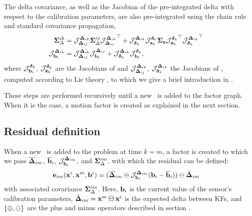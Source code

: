 The delta covariance, as well as the Jacobian of the pre-integrated delta with respect to the calibration parameters, are also pre-integrated using the chain rule and standard 
covariance propagation,
%
\begin{align}
    {\bm \Sigma}_\Delta^{ik} &= {\mathcal{J}^{{{\bm \Delta}}_{ik}}_{{{\bm \Delta}}_{ij}}}{\bm \Sigma}_\Delta^{ij}{\mathcal{J}^{{{\bm \Delta}}_{ik}}_{{{\bm \Delta}}_{ij}}}^{\top} 
    + {\mathcal{J}^{{{\bm \Delta}}_{ik}}_{\bm\delta_k}}{\mathcal{J}^{\bm\delta_k}_{{\bf z}_k}}{\bm \Sigma}_{\bf z}{\mathcal{J}^{\bm\delta_k}_{{\bf z}_k}}^{\top}{\mathcal{J}^{{{\bm \Delta}}_{ik}}_{\bm\delta_k}}^{\top}
    \\
    {\mathcal{J}^{{{\bm \Delta}}_{ik}}_{{\bf b}_i}} &= {\mathcal{J}^{{{\bm \Delta}}_{ik}}_{{{\bm \Delta}}_{ij}}}{\mathcal{J}^{{{\bm \Delta}}_{ij}}_{{\bf b}_i}} 
    + {\mathcal{J}^{{{\bm \Delta}}_{ik}}_{\bm\delta_k}}{\mathcal{J}^{\bm\delta_k}_{{\bf b}_i}} ,
\end{align}
%
where ${\mathcal{J}^{\bm\delta_k}_{{\bf b}_i}}$, ${\mathcal{J}^{\bm\delta_k}_{{\bf z}_k}}$ are the Jacobians of  and ${\mathcal{J}^{{{\bm \Delta}}_{ik}}_{{{\bm \Delta}}_{ij}}}$, ${\mathcal{J}^{{{\bm \Delta}}_{ik}}_{\bm\delta_k}}$ the 
Jacobians of , computed according to Lie theory \cite{sola2018micro}, to which we give a brief introduction in .



\bigskip

These steps are performed recursively until a new \keyframe\ is added to the factor graph. When it 
is the case, a motion factor is created as explained in the next section.


\subsection{Residual definition}
\label{sec:preint_residual}

When a new \keyframe\ is added to the problem at time $k=m$,
a factor is created to which we pass $\overline{{{\bm \Delta}}}_{im}$, $\overline{{\bf b}}_i$,  ${\mathcal{J}^{{{\bm \Delta}}_{im}}_{{\bf b}_i}}$, and ${\bm \Sigma}_\Delta^{im}$, with which the residual can be defined:
%
%
\begin{align}
    {\bf e}_{im}({\bf x}^i, {\bf x}^m, {\bf b}^i) =  (\overline{{{\bm \Delta}}}_{im} \oplus {\mathcal{J}^{{{\bm \Delta}}_{im}}_{{\bf b}_i}}({\bf b}_i-\overline{{\bf b}}_i) ) \ominus \hat{{{\bm \Delta}}}_{im} 
    \label{eq:preint_residual}
\end{align}
%
with associated covariance ${\bm \Sigma}_\Delta^{im}$.
Here, ${\bf b}_i$ is the current  value of the sensor's calibration parameters,  $\hat{{{\bm \Delta}}}_{im}={\bf x}^m\boxminus{\bf x}^i$ is the expected delta between KFs, and $\{\oplus,\ominus\}$ are the 
 plus and minus operators described in section . 

